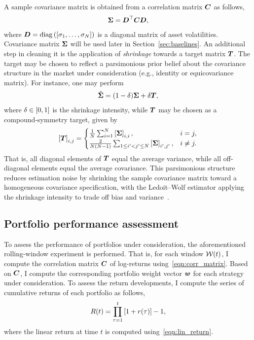 \documentclass[pdflatex,sn-basic]{sn-jnl}%
\theoremstyle{thmstyleone}%
\theoremstyle{thmstyletwo}%
\theoremstyle{thmstylethree}%
\begin{document}
A sample covariance matrix is obtained from a correlation matrix $\boldsymbol{C}$ as follows,
\begin{equation}
\label{eqn:cov_corr}
    \boldsymbol{\Sigma}=\boldsymbol{D}^{\top}\boldsymbol{C}\boldsymbol{D},
\end{equation}
where $\boldsymbol{D} = \operatorname{diag}\left( [\sigma_1, \ldots, \sigma_N] \right)$ is a diagonal matrix of asset volatilities. 
Covariance matrix $\boldsymbol{\Sigma}$ will be used later in Section~\ref{sec:baselines}. 
An additional step in cleaning it is the application of \emph{shrinkage} \citep{ledoit2004well} towards a target matrix $\boldsymbol{T}$. The target may be chosen to reflect a parsimonious prior belief about the covariance structure in the market under consideration (e.g., identity or equicovariance matrix). For instance, one may perform
\begin{equation}
\label{eqn:shrinkage}
    \tilde{\boldsymbol{\Sigma}} = (1-\delta) \boldsymbol{\Sigma} + \delta \boldsymbol{T},
\end{equation}
where $\delta\in\left[ 0,1 \right]$ is the shrinkage intensity, while $\boldsymbol{T}$ may be chosen as a compound-symmetry target, given by
\begin{equation}
\label{eqn:const_cov_target}
    \left[ \boldsymbol{T} \right]_{i,j}=
\begin{cases}
\frac{1}{N}\sum_{i=1}^{N}\left[ \boldsymbol{\Sigma} \right]_{i,i}, & i=j,\\
\frac{2}{N(N-1)}\sum_{1\le i'<j'\le N}\left[ \boldsymbol{\Sigma} \right]_{i',j'},     & i\neq j.
\end{cases}
\end{equation}
That is, all diagonal elements of $\boldsymbol{T}$ equal the average variance, while all off-diagonal elements equal the average covariance. This parsimonious structure reduces estimation noise by shrinking the sample covariance matrix toward a homogeneous covariance specification, with the Ledoit–Wolf estimator applying the shrinkage intensity to trade off bias and variance~\citep{ledoit2004well}.

\subsection{Portfolio performance assessment}
To assess the performance of portfolios under consideration, the aforementioned rolling-window experiment is performed. That is, for each window $\mathcal{W}(t)$, I compute the correlation matrix $\boldsymbol{C}$ of log-returns using~\eqref{eqn:corr_matrix}. Based on $\boldsymbol{C}$, I compute the corresponding portfolio weight vector $\boldsymbol{w}$ for each strategy under consideration. To assess the return developments, I compute the series of cumulative returns of each portfolio as follows,
\begin{equation}
    R(t) = \prod_{\tau=1}^{t} \left[ 1 + r(\tau) \right] - 1,
\end{equation}
where the linear return at time $t$ is computed using~\eqref{eqn:lin_return}.
\end{document}
